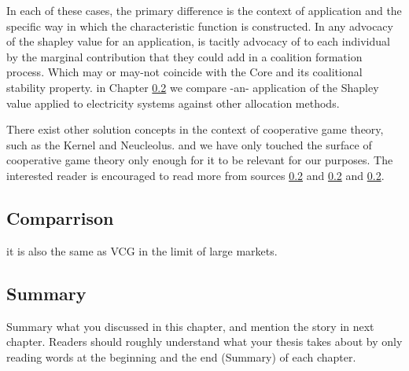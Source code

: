 


In each of these cases, the primary difference is the context of application and the specific way in which the characteristic function is constructed.
In any advocacy of the shapley value for an application, is tacitly advocacy of to each individual by the marginal contribution that they could add in a coalition formation process.
Which may or may-not coincide with the Core and its coalitional stability property.
in Chapter \ref{} we compare -an- application of the Shapley value applied to electricity systems against other allocation methods.

There exist other solution concepts in the context of cooperative game theory, such as the Kernel and Neucleolus. and we have only touched the surface of cooperative game theory only enough for it to be relevant for our purposes.
The interested reader is encouraged to read more from sources \ref{} and \ref{} and \ref{}.

\subsection{Comparrison}



it is also the same as VCG in the limit of large markets.

\subsection{Summary}
Summary what you discussed in this chapter, and mention the story in next
chapter. Readers should roughly understand what your thesis takes about by only reading
words at the beginning and the end (Summary) of each chapter.




